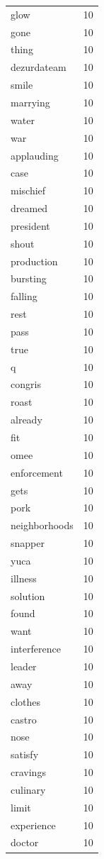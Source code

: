 \begin{tabular}{lr}
glow & 10 \\
gone & 10 \\
thing & 10 \\
dezurdateam & 10 \\
smile & 10 \\
marrying & 10 \\
water & 10 \\
war & 10 \\
applauding & 10 \\
case & 10 \\
mischief & 10 \\
dreamed & 10 \\
president & 10 \\
shout & 10 \\
production & 10 \\
bursting & 10 \\
falling & 10 \\
rest & 10 \\
pass & 10 \\
true & 10 \\
q & 10 \\
congris & 10 \\
roast & 10 \\
already & 10 \\
fit & 10 \\
omee & 10 \\
enforcement & 10 \\
gets & 10 \\
pork & 10 \\
neighborhoods & 10 \\
snapper & 10 \\
yuca & 10 \\
illness & 10 \\
solution & 10 \\
found & 10 \\
want & 10 \\
interference & 10 \\
leader & 10 \\
away & 10 \\
clothes & 10 \\
castro & 10 \\
nose & 10 \\
satisfy & 10 \\
cravings & 10 \\
culinary & 10 \\
limit & 10 \\
experience & 10 \\
doctor & 10 \\

\end{tabular}
